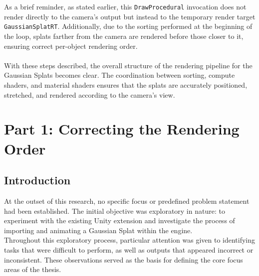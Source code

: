 \documentclass[12pt]{article}
\begin{document}
\\\\
As a brief reminder, as stated earlier, this \texttt{DrawProcedural} invocation does not render directly to the camera’s output but instead to the temporary render target \texttt{GaussianSplatRT}. Additionally, due to the sorting performed at the beginning of the loop, splats farther from the camera are rendered before those closer to it, ensuring correct per-object rendering order.\\\\
With these steps described, the overall structure of the rendering pipeline for the Gaussian Splats becomes clear. The coordination between sorting, compute shaders, and material shaders ensures that the splats are accurately positioned, stretched, and rendered according to the camera’s view.
\section{Part 1: Correcting the Rendering Order}    
\subsection{Introduction}   
At the outset of this research, no specific focus or predefined problem statement had been established. The initial objective was exploratory in nature: to experiment with the existing Unity extension and investigate the process of importing and animating a Gaussian Splat within the engine.\\
Throughout this exploratory process, particular attention was given to identifying tasks that were difficult to perform, as well as outputs that appeared incorrect or inconsistent. These observations served as the basis for defining the core focus areas of the thesis.
\end{document}
